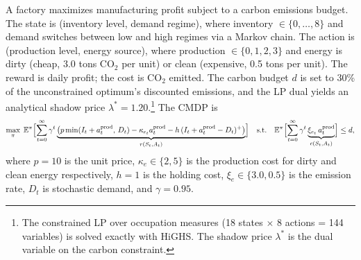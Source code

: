 A factory maximizes manufacturing profit subject to a carbon
emissions budget. The state is (inventory level, demand regime),
where inventory $\in \{0,\ldots,8\}$ and demand switches between
low and high regimes via a Markov chain. The action is
(production level, energy source), where production $\in \{0,1,2,3\}$
and energy is dirty (cheap, 3.0 tons CO$_2$ per unit) or clean
(expensive, 0.5 tons per unit). The reward is daily profit; the
cost is CO$_2$ emitted. The carbon budget $d$ is set to 30\% of the
unconstrained optimum's discounted emissions, and the LP dual
yields an analytical shadow price $\lambda^* = 1.20$.\footnote{The
constrained LP over occupation measures (18 states $\times$ 8
actions = 144 variables) is solved exactly with HiGHS. The shadow
price $\lambda^*$ is the dual variable on the carbon constraint.}
The CMDP is
\begin{equation}
  \max_\pi \; \mathbb{E}^\pi\Bigl[\sum_{t=0}^\infty \gamma^t
    \underbrace{\bigl(p \min(I_t + a^{\mathrm{prod}}_t,\, D_t)
    - \kappa_{e_t} a^{\mathrm{prod}}_t
    - h\,(I_t + a^{\mathrm{prod}}_t - D_t)^+\bigr)}_{r(S_t, A_t)}\Bigr]
  \quad \text{s.t.} \quad
  \mathbb{E}^\pi\Bigl[\sum_{t=0}^\infty \gamma^t
    \underbrace{\xi_{e_t}\, a^{\mathrm{prod}}_t}_{c(S_t, A_t)}\Bigr]
  \leq d,
  \label{eq:carbon_cmdp}
\end{equation}
where $p = 10$ is the unit price, $\kappa_e \in \{2, 5\}$ is the
production cost for dirty and clean energy respectively,
$h = 1$ is the holding cost, $\xi_e \in \{3.0, 0.5\}$ is the
emission rate, $D_t$ is stochastic demand, and $\gamma = 0.95$.

